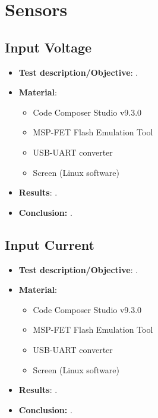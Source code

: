 \section{Sensors}

\subsection{Input Voltage}

\begin{itemize}
    \item \textbf{Test description/Objective}: .
    \item \textbf{Material}:
        \begin{itemize}
            \item Code Composer Studio v9.3.0
            \item MSP-FET Flash Emulation Tool
            \item USB-UART converter
            \item Screen (Linux software)
        \end{itemize}
    \item \textbf{Results}: .
    \item \textbf{Conclusion:} .
\end{itemize}

\subsection{Input Current}

\begin{itemize}
    \item \textbf{Test description/Objective}: .
    \item \textbf{Material}:
        \begin{itemize}
            \item Code Composer Studio v9.3.0
            \item MSP-FET Flash Emulation Tool
            \item USB-UART converter
            \item Screen (Linux software)
        \end{itemize}
    \item \textbf{Results}: .
    \item \textbf{Conclusion:} .
\end{itemize}

